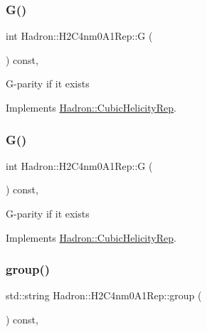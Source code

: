 \subsubsection{\texorpdfstring{G()}{G()}\hspace{0.1cm}{\footnotesize\ttfamily [1/2]}}
{\footnotesize\ttfamily int Hadron\+::\+H2\+C4nm0\+A1\+Rep\+::G (\begin{DoxyParamCaption}{ }\end{DoxyParamCaption}) const\hspace{0.3cm}{\ttfamily [inline]}, {\ttfamily [virtual]}}

G-\/parity if it exists 

Implements \mbox{\hyperlink{structHadron_1_1CubicHelicityRep_a50689f42be1e6170aa8cf6ad0597018b}{Hadron\+::\+Cubic\+Helicity\+Rep}}.

\mbox{\label{structHadron_1_1H2C4nm0A1Rep_aec6a6ccbc60586777420574c4047446b}} 
\subsubsection{\texorpdfstring{G()}{G()}\hspace{0.1cm}{\footnotesize\ttfamily [2/2]}}
{\footnotesize\ttfamily int Hadron\+::\+H2\+C4nm0\+A1\+Rep\+::G (\begin{DoxyParamCaption}{ }\end{DoxyParamCaption}) const\hspace{0.3cm}{\ttfamily [inline]}, {\ttfamily [virtual]}}

G-\/parity if it exists 

Implements \mbox{\hyperlink{structHadron_1_1CubicHelicityRep_a50689f42be1e6170aa8cf6ad0597018b}{Hadron\+::\+Cubic\+Helicity\+Rep}}.

\mbox{\label{structHadron_1_1H2C4nm0A1Rep_ae21ccc52d2b7461dd5dddbfa46b8f878}} 
\subsubsection{\texorpdfstring{group()}{group()}\hspace{0.1cm}{\footnotesize\ttfamily [1/3]}}
{\footnotesize\ttfamily std\+::string Hadron\+::\+H2\+C4nm0\+A1\+Rep\+::group (\begin{DoxyParamCaption}{ }\end{DoxyParamCaption}) const\hspace{0.3cm}{\ttfamily [inline]}, {\ttfamily [virtual]}}

